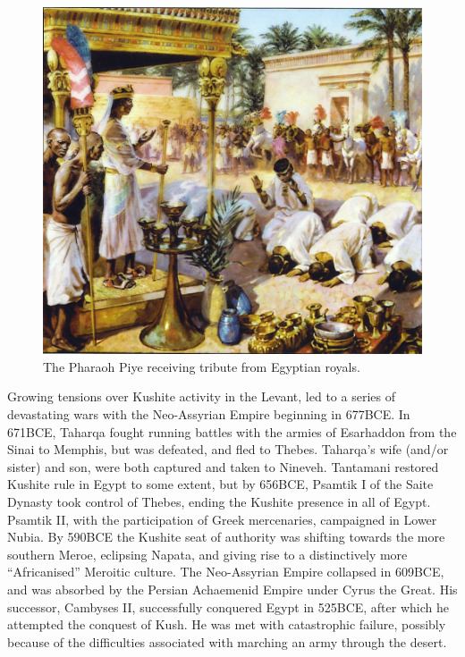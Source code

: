 \documentclass[a4paper,12pt]{scrreprt}
\begin{document}
\begin{figure}[H]
	\centering
	\includegraphics[width=\textwidth]{img/piye_tribute}
	\caption{The Pharaoh Piye receiving tribute from Egyptian royals.}
\end{figure}

Growing tensions over Kushite activity in the Levant, led to a series of devastating wars with the Neo-Assyrian Empire beginning in 677BCE. In 671BCE, Taharqa fought running battles with the armies of Esarhaddon from the Sinai to Memphis, but was defeated, and fled to Thebes. Taharqa’s wife (and/or sister) and son, were both captured and taken to Nineveh. Tantamani restored Kushite rule in Egypt to some extent, but by 656BCE, Psamtik I of the Saite Dynasty took control of Thebes, ending the Kushite presence in all of Egypt. Psamtik II, with the participation of Greek mercenaries, campaigned in Lower Nubia. By 590BCE the Kushite seat of authority was shifting towards the more southern Meroe, eclipsing Napata, and giving rise to a distinctively more “Africanised” Meroitic culture. The Neo-Assyrian Empire collapsed in 609BCE, and was absorbed by the Persian Achaemenid Empire under Cyrus the Great. His successor, Cambyses II, successfully conquered Egypt in 525BCE, after which he attempted the conquest of Kush. He was met with catastrophic failure, possibly because of the difficulties associated with marching an army through the desert.
\end{document}
